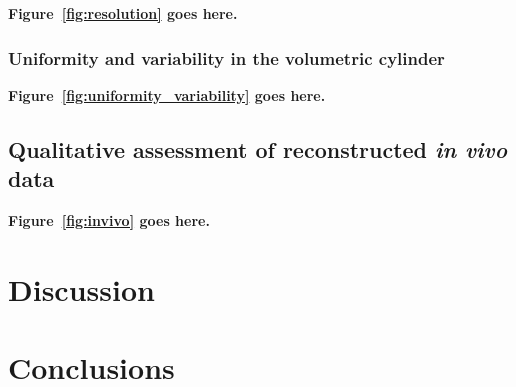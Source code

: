 \documentclass[utf8]{FrontiersinVancouver}
\begin{document}
\noindent \textbf{Figure~\ref{fig:resolution} goes here.}


\subsubsection{Uniformity and variability in the volumetric cylinder}



\noindent \textbf{Figure~\ref{fig:uniformity_variability} goes here.}


\subsection{Qualitative assessment of reconstructed \textit{in vivo} data}



\noindent \textbf{Figure~\ref{fig:invivo} goes here.}

\section{Discussion}


\section{Conclusions}




\end{document}
